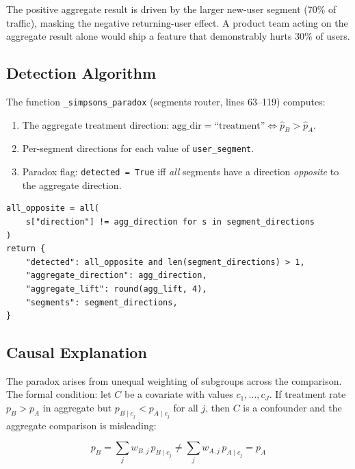 The positive aggregate result is driven by the larger new-user segment (70\% of
traffic), masking the negative returning-user effect. A product team acting on
the aggregate result alone would ship a feature that demonstrably hurts 30\%
of users.

\subsection{Detection Algorithm}

The function \texttt{\_simpsons\_paradox} (segments router, lines 63--119) computes:

\begin{enumerate}
  \item The aggregate treatment direction:
    $\text{agg\_dir} = \text{``treatment''} \iff \hat{p}_B > \hat{p}_A$.
  \item Per-segment directions for each value of \texttt{user\_segment}.
  \item Paradox flag: \texttt{detected = True} iff \emph{all} segments have a
    direction \emph{opposite} to the aggregate direction.
\end{enumerate}

\begin{lstlisting}[style=python, caption={Simpson's Paradox detection (routers/segments.py lines 106--113)}]
all_opposite = all(
    s["direction"] != agg_direction for s in segment_directions
)
return {
    "detected": all_opposite and len(segment_directions) > 1,
    "aggregate_direction": agg_direction,
    "aggregate_lift": round(agg_lift, 4),
    "segments": segment_directions,
}
\end{lstlisting}

\subsection{Causal Explanation}

The paradox arises from unequal weighting of subgroups across the comparison.
The formal condition: let $C$ be a covariate with values $c_1, \ldots, c_J$.
If treatment rate $p_B > p_A$ in aggregate but $p_{B \mid c_j} < p_{A \mid c_j}$
for all $j$, then $C$ is a confounder and the aggregate comparison is misleading:

\begin{equation}
  p_B = \sum_j w_{B,j}\, p_{B \mid c_j}
  \neq
  \sum_j w_{A,j}\, p_{A \mid c_j} = p_A
\end{equation}

